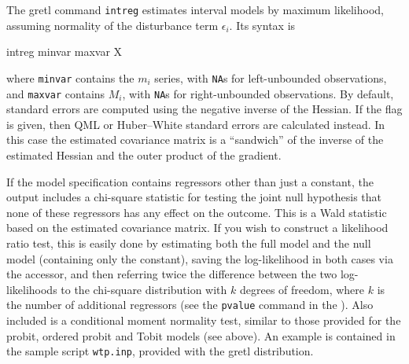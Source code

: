 The gretl command \texttt{intreg} estimates interval models by
maximum likelihood, assuming normality of the disturbance term
$\epsilon_i$.  Its syntax is
%
\begin{code}
intreg minvar maxvar X
\end{code}
%
where \texttt{minvar} contains the $m_i$ series, with \texttt{NA}s for
left-unbounded observations, and \texttt{maxvar} contains $M_i$, with
\texttt{NA}s for right-unbounded observations.  By default, standard
errors are computed using the negative inverse of the Hessian.  If the
 flag is given, then QML or Huber--White standard
errors are calculated instead. In this case the estimated covariance
matrix is a ``sandwich'' of the inverse of the estimated Hessian and
the outer product of the gradient.

If the model specification contains regressors other than just a
constant, the output includes a chi-square statistic for testing the
joint null hypothesis that none of these regressors has any effect on
the outcome.  This is a Wald statistic based on the estimated
covariance matrix.  If you wish to construct a likelihood ratio test,
this is easily done by estimating both the full model and the null
model (containing only the constant), saving the log-likelihood in
both cases via the  accessor, and then referring twice the
difference between the two log-likelihoods to the chi-square
distribution with $k$ degrees of freedom, where $k$ is the number of
additional regressors (see the \texttt{pvalue} command in the
\GCR). Also included is a conditional moment normality test, similar
to those provided for the probit, ordered probit and Tobit models (see
above).  An example is contained in the sample script
\texttt{wtp.inp}, provided with the gretl distribution.

